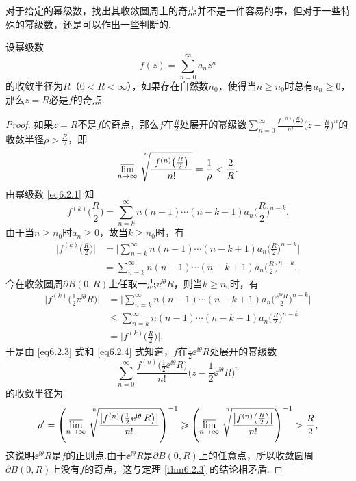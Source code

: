 对于给定的幂级数，找出其收敛圆周上的奇点并不是一件容易的事，但对于一些特殊的幂级数，还是可以作出一些判断的.

\begin{prop}\label{prop6.2.4}
  设幂级数
  \[
    f(z) = \sum_{n=0}^\infty a_nz^n
  \]
  的收敛半径为$R$（$0<R<\infty$），如果存在自然数$n_0$，使得当$n\ge n_0$时总有$a_n\ge0$，那么$z=R$必是$f$的奇点.
\end{prop}
\begin{proof}
  如果$z=R$不是$f$的奇点，那么$f$在$\frac R2$处展开的幂级数$\sum_{n=0}^\infty
  \frac{f^{(n)}\big(\frac R2\big)}{n!}\bigg(z-\frac R2\bigg)^n$的收敛半径$\rho>\frac R2$，即
  \begin{equation}\label{eq6.2.3}
    \varlimsup_{n\to\infty}\sqrt[\leftroot{-4}\uproot{20}n]{
    \frac{\big|f^{(n)}\big(\frac R2\big)\big|}{n!}}=\frac1\rho<\frac2R.
  \end{equation}
  由幂级数 \eqref{eq6.2.1} 知
  \[
    f^{(k)}\bigg(\frac R2\bigg) = \sum_{n=k}^\infty n(n-1)\cdots(n-k+1)a_n
    \bigg(\frac R2\bigg)^{n-k}.
  \]
  由于当$n\ge n_0$时$a_n\ge0$，故当$k\ge n_0$时，有
  \begin{align*}
    \bigg|f^{(k)}\bigg(\frac R2\bigg)\bigg|
    & = \bigg|\sum_{n=k}^\infty n(n-1)\cdots(n-k+1)a_n\bigg(\frac R2\bigg)^{n-k}\bigg|\\
    & = \sum_{n=k}^\infty n(n-1)\cdots(n-k+1)a_n\bigg(\frac R2\bigg)^{n-k}.
  \end{align*}
  今在收敛圆周$\partial B(0,R)$上任取一点$\ee^{\ii\theta}R$，则当$k\ge n_0$时，有
  \begin{equation}\label{eq6.2.4}
    \begin{aligned}
      \bigg|f^{(k)}\bigg(\frac12\ee^{\ii\theta}R\bigg)\bigg|
      & = \bigg|\sum_{n=k}^\infty n(n-1)\cdots(n-k+1)a_n\bigg(\frac {\ee^{\ii\theta}R}2\bigg)^{n-k}\bigg|\\
      & \le \sum_{n=k}^\infty n(n-1)\cdots(n-k+1)a_n\bigg(\frac R2\bigg)^{n-k}\\
      & = \bigg|f^{(k)}\bigg(\frac R2\bigg)\bigg|.
    \end{aligned}
  \end{equation}
  于是由 \eqref{eq6.2.3} 式和 \eqref{eq6.2.4} 式知道，$f$在$\frac12\ee^{\ii\theta}R$处展开的幂级数
  \[
    \sum_{n=0}^\infty\frac{f^{(n)}\big(\frac12\ee^{\ii\theta}R\big)}{n!}
    \bigg(z-\frac12\ee^{\ii\theta}R\bigg)^n
  \]
  的收敛半径为
  \[
    \rho' = \left(\varlimsup_{n\to\infty}
    \sqrt[\leftroot{-4}\uproot{20}n]{
    \frac{\big|f^{(n)}\big(\frac 12\ee^{\ii\theta}R\big)\big|}{n!}}\right)^{-1}
    \ge\left(\varlimsup_{n\to\infty}\sqrt[\leftroot{-4}\uproot{20}n]{
    \frac{\big|f^{(n)}\big(\frac R2\big)\big|}{n!}}\right)^{-1}
    >\frac R2,
  \]
  这说明$\ee^{\ii\theta}R$是$f$的正则点.由于$\ee^{\ii\theta}R$是$\partial B(0,R)$上的任意点，所以收敛圆周$\partial B(0,R)$上没有$f$的奇点，这与定理 \ref{thm6.2.3} 的结论相矛盾.
\end{proof}

